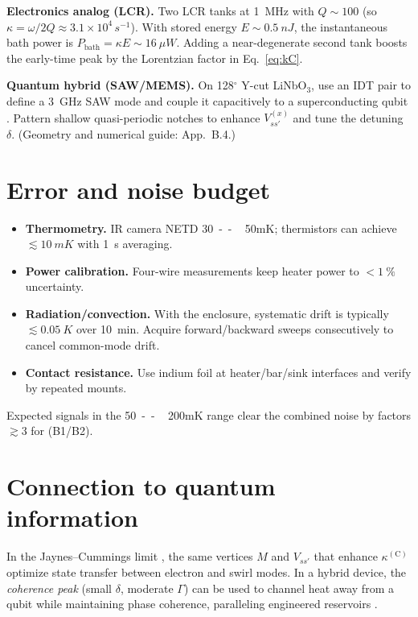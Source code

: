 \documentclass[aps,prb,preprint,amsmath,amssymb]{revtex4-2} %
\begin{document}
        \textbf{Electronics analog (LCR).} Two LCR tanks at \SI{1}{MHz} with $Q\!\sim\!100$ (so $\kappa=\omega/2Q\approx3.1\times10^4\,\si{s^{-1}}$). With stored energy $E\!\sim\!\SI{0.5}{nJ}$, the instantaneous bath power is $P_\text{bath}=\kappa E\sim\SI{16}{\mu W}$. Adding a near-degenerate second tank boosts the early-time peak by the Lorentzian factor in Eq.~\eqref{eq:kC}.

        \textbf{Quantum hybrid (SAW/MEMS).} On 128$^\circ$ Y-cut LiNbO$_3$, use an IDT pair to define a \SI{3}{GHz} SAW mode and couple it capacitively to a superconducting qubit \cite{Aspelmeyer2014,Manenti2017}. Pattern shallow quasi-periodic notches to enhance $V^{(x)}_{ss'}$ and tune the detuning $\delta$.
        (Geometry and numerical guide: App.~B.4.)

    \section{Error and noise budget}
        \begin{itemize}
            \item \textbf{Thermometry.} IR camera NETD \SI{30}{--\,50}{mK}; thermistors can achieve $\lesssim\SI{10}{mK}$ with \SI{1}{s} averaging.
            \item \textbf{Power calibration.} Four-wire measurements keep heater power to $<\!\SI{1}{\percent}$ uncertainty.
            \item \textbf{Radiation/convection.} With the enclosure, systematic drift is typically $\lesssim\SI{0.05}{K}$ over \SI{10}{min}. Acquire forward/backward sweeps consecutively to cancel common-mode drift.
            \item \textbf{Contact resistance.} Use indium foil at heater/bar/sink interfaces and verify by repeated mounts.
        \end{itemize}
        Expected signals in the \SI{50}{--\,200}{mK} range clear the combined noise by factors $\gtrsim3$ for (B1/B2).

    \section{Connection to quantum information}
        In the Jaynes--Cummings limit \cite{Jaynes1963}, the same vertices $M$ and $V_{ss'}$ that enhance $\kappa^{(\mathrm C)}$ optimize state transfer between electron and swirl modes. In a hybrid device, the \emph{coherence peak} (small $\delta$, moderate $\Gamma$) can be used to channel heat away from a qubit while maintaining phase coherence, paralleling engineered reservoirs \cite{Breuer2002,Aspelmeyer2014}.
\end{document}
